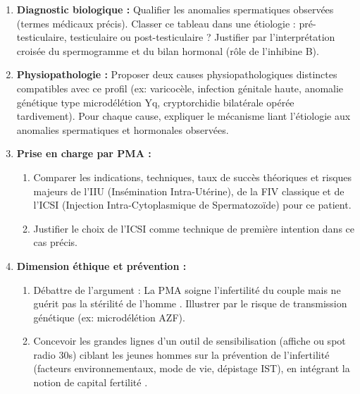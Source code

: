 \documentclass[11pt]{article}
\begin{document}
\begin{exercice}
\begin{enumerate}
    \item \textbf{Diagnostic biologique :} Qualifier les anomalies spermatiques observées (termes médicaux précis). Classer ce tableau dans une étiologie : pré-testiculaire, testiculaire ou post-testiculaire ? Justifier par l'interprétation croisée du spermogramme et du bilan hormonal (rôle de l'inhibine B).
    \item \textbf{Physiopathologie :} Proposer deux causes physiopathologiques distinctes compatibles avec ce profil (ex: varicocèle, infection génitale haute, anomalie génétique type microdélétion Yq, cryptorchidie bilatérale opérée tardivement). Pour chaque cause, expliquer le mécanisme liant l'étiologie aux anomalies spermatiques et hormonales observées.
    \item \textbf{Prise en charge par PMA :} 
    \begin{enumerate}
        \item Comparer les indications, techniques, taux de succès théoriques et risques majeurs de l'IIU (Insémination Intra-Utérine), de la FIV classique et de l'ICSI (Injection Intra-Cytoplasmique de Spermatozoïde) pour ce patient.
        \item Justifier le choix de l'ICSI comme technique de première intention dans ce cas précis.
    \end{enumerate}
    \item \textbf{Dimension éthique et prévention :} 
    \begin{enumerate}
        \item Débattre de l'argument : \og La PMA soigne l'infertilité du couple mais ne guérit pas la stérilité de l'homme \fg. Illustrer par le risque de transmission génétique (ex: microdélétion AZF).
        \item Concevoir les grandes lignes d'un outil de sensibilisation (affiche ou spot radio 30s) ciblant les jeunes hommes sur la prévention de l'infertilité (facteurs environnementaux, mode de vie, dépistage IST), en intégrant la notion de \og capital fertilité \fg.
    \end{enumerate}
\end{enumerate}
\end{exercice}
\end{document}

